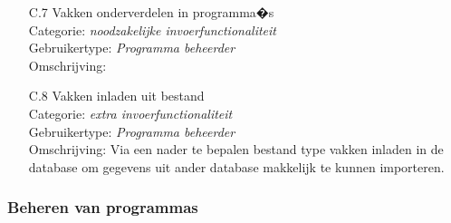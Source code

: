 \documentclass{article}
\begin{document}
\begin{itemize}
\item[C.7] Vakken onderverdelen in programma�s \\
Categorie: \textit{noodzakelijke invoerfunctionaliteit} \\
Gebruikertype: \textit{Programma beheerder} \\
Omschrijving: \\[-3mm]

\item[C.8] Vakken inladen uit bestand \\
Categorie: \textit{extra invoerfunctionaliteit} \\
Gebruikertype: \textit{Programma beheerder} \\
Omschrijving: Via een nader te bepalen bestand type vakken inladen in de database om gegevens uit ander database makkelijk te kunnen importeren. \\[-3mm]
\end{itemize}

\subsubsection{Beheren van programmas}
\end{document}
